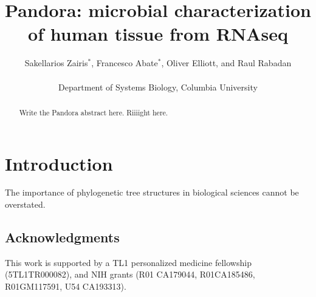 \documentclass[twocolumn,11pt]{article}
\begin{document}
\title{Pandora: microbial characterization of human tissue from RNAseq}

\author{Sakellarios Zairis$^*$, Francesco Abate$^*$, Oliver Elliott, and Raul Rabadan\\
\\
Department of Systems Biology, Columbia University}
\maketitle



\begin{abstract}

Write the Pandora abstract here.
Riiiight here.

\end{abstract}


\section{Introduction}

The importance of phylogenetic tree structures in biological sciences cannot be overstated.~\cite{malmgren1955localization}


\subsection*{Acknowledgments}

This work is supported by a TL1 personalized medicine fellowship (5TL1TR000082), and NIH grants (R01 CA179044, R01CA185486, R01GM117591, U54 CA193313).



\end{document}
